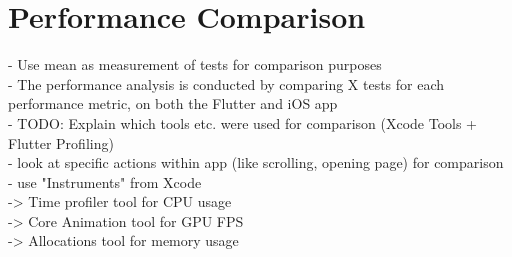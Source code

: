 \chapter{Performance Comparison}

- Use mean as measurement of tests for comparison purposes\\
- The performance analysis is conducted by comparing X tests for each performance metric, on both the Flutter and iOS app\\
- TODO: Explain which tools etc. were used for comparison (Xcode Tools + Flutter Profiling)\\
- look at specific actions within app (like scrolling, opening page) for comparison\\
- use "Instruments" from Xcode\\
-> Time profiler tool for CPU usage\\
-> Core Animation tool for GPU FPS\\
-> Allocations tool for memory usage\\